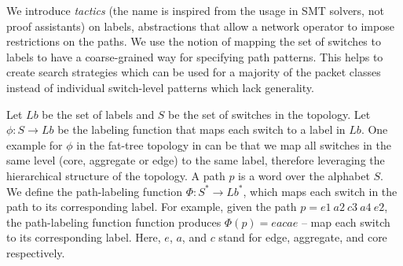 We introduce \emph{tactics} (the name is inspired from the usage in SMT solvers, not 
proof assistants)
on labels, abstractions that allow a
network operator to impose restrictions on the paths. 
We use the notion of mapping the set of switches to labels to 
have a coarse-grained way for specifying path patterns. This helps
to create search strategies which can be used for a majority 
of the packet classes instead of individual switch-level patterns which
lack generality.

 Let $Lb$ be the set of labels and $S$ be the set of switches in the topology. Let $\phi : S \rightarrow Lb$ be the labeling function that maps each switch to a label in $Lb$. One example for $\phi$ in the fat-tree topology in  can be that we map all switches in the same level (core, aggregate or edge) to the same label,
therefore leveraging the hierarchical structure of the topology. A path $p$ is a word over the alphabet $S$. 
We define the path-labeling function $\Phi : S^* \rightarrow Lb^*$,  which maps each switch in the path to its corresponding 
 label. 
 For example, given the path $p = e1\ a2\ c3\ a4\ e2$, the path-labeling function function produces $\Phi(p) = eacae$ -- map each switch to its corresponding label.
 Here, $e$, $a$, and $c$ stand for edge, aggregate, and core respectively.

